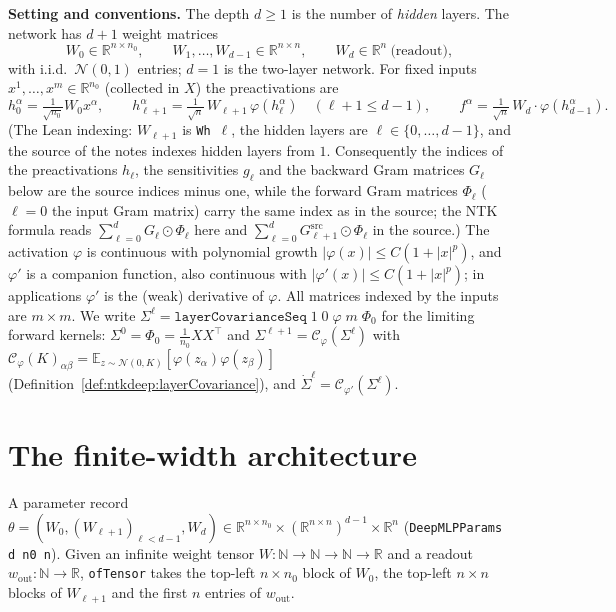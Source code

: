 \medskip\noindent\textbf{Setting and conventions.}
The depth $d\ge1$ is the number of \emph{hidden} layers. The network has $d+1$ weight matrices
\[
  W_0\in\mathbb R^{n\times n_0},\qquad W_1,\dots,W_{d-1}\in\mathbb R^{n\times n},\qquad W_d\in\mathbb R^n\ \text{(readout)},
\]
with i.i.d.\ $\mathcal N(0,1)$ entries; $d=1$ is the two-layer network. For fixed inputs $x^1,\dots,x^m\in\mathbb R^{n_0}$ (collected in $X$) the preactivations are
\[
  h_0^\alpha=\tfrac1{\sqrt{n_0}}W_0x^\alpha,\qquad h_{\ell+1}^\alpha=\tfrac1{\sqrt n}\,W_{\ell+1}\,\varphi(h_\ell^\alpha)\quad(\ell+1\le d-1),\qquad f^\alpha=\tfrac1{\sqrt n}\,W_d\cdot\varphi(h_{d-1}^\alpha).
\]
(The Lean indexing: $W_{\ell+1}$ is \texttt{Wh}~$\ell$, the hidden layers are $\ell\in\{0,\dots,d-1\}$, and the source of the notes indexes hidden layers from $1$. Consequently the indices of the preactivations $h_\ell$, the sensitivities $g_\ell$ and the backward Gram matrices $G_\ell$ below are the source indices minus one, while the forward Gram matrices $\Phi_\ell$ ($\ell=0$ the input Gram matrix) carry the same index as in the source; the NTK formula reads $\sum_{\ell=0}^dG_\ell\odot\Phi_\ell$ here and $\sum_{\ell=0}^dG^{\mathrm{src}}_{\ell+1}\odot\Phi_\ell$ in the source.) The activation $\varphi$ is continuous with polynomial growth $|\varphi(x)|\le C(1+|x|^p)$, and $\varphi'$ is a companion function, also continuous with $|\varphi'(x)|\le C(1+|x|^p)$; in applications $\varphi'$ is the (weak) derivative of $\varphi$. All matrices indexed by the inputs are $m\times m$. We write $\Sigma^\ell=\texttt{layerCovarianceSeq}\;1\;0\;\varphi\;m\;\Phi_0$ for the limiting forward kernels: $\Sigma^0=\Phi_0=\frac1{n_0}XX^\top$ and $\Sigma^{\ell+1}=\mathcal C_\varphi(\Sigma^\ell)$ with $\mathcal C_\varphi(K)_{\alpha\beta}=\mathbb E_{z\sim\mathcal N(0,K)}[\varphi(z_\alpha)\varphi(z_\beta)]$ (Definition~\ref{def:ntkdeep:layerCovariance}), and $\dot\Sigma^\ell=\mathcal C_{\varphi'}(\Sigma^\ell)$.


\section{The finite-width architecture}\label{sec:ntkdn:architecture}

\begin{definition}\label{def:ntkdn:params}
  \leanok
A parameter record $\theta=(W_0,(W_{\ell+1})_{\ell<d-1},W_d)\in\mathbb R^{n\times n_0}\times(\mathbb R^{n\times n})^{d-1}\times\mathbb R^n$ (\texttt{DeepMLPParams d n0 n}). Given an infinite weight tensor $W:\mathbb N\to\mathbb N\to\mathbb N\to\mathbb R$ and a readout $w_{\mathrm{out}}:\mathbb N\to\mathbb R$, \texttt{ofTensor} takes the top-left $n\times n_0$ block of $W_0$, the top-left $n\times n$ blocks of $W_{\ell+1}$ and the first $n$ entries of $w_{\mathrm{out}}$.
\end{definition}


